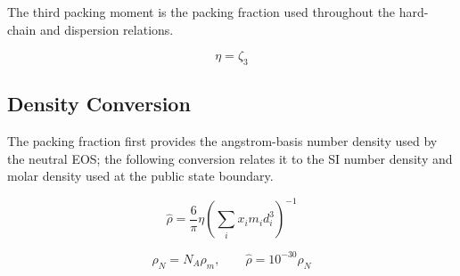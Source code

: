 \documentclass[12pt, letterpaper]{article}
\begin{document}
The third packing moment is the packing fraction used throughout the hard-chain and dispersion relations.

\begin{equation}
    \eta=\zeta_{3}
    \label{eq:zeta3_eta}
\end{equation}

\subsection{Density Conversion}

The packing fraction first provides the angstrom-basis number density used by the neutral EOS; the following conversion relates it to the SI number density and molar density used at the public state boundary.

\begin{equation}
    \hat{\rho}=\frac{6}{\pi} \eta\left(\sum_{i} x_{i} m_{i} d_{i}^3\right)^{-1}
    \label{eq:rho_from_eta}
\end{equation}


\begin{equation}
    \rho_{N}=N_A\rho_m,
    \qquad
    \hat{\rho}=10^{-30}\rho_{N}
    \label{eq:rho_reduced}
\end{equation}

\end{document}
